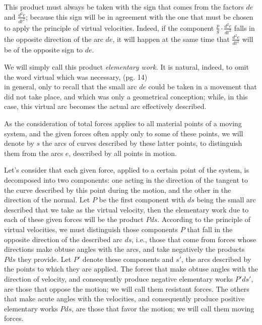\documentclass{book}
\begin{document}
This product must always be taken with the sign that comes from the factors \(de\) and \(\frac{d^2e}{dt^2}\); because this sign will be in agreement with the one that must be chosen to apply the principle of virtual velocities. Indeed, if the component \(\frac{p}{g} \cdot \frac{d^2e}{dt^2}\) falls in the opposite direction of the arc \(de\), it will happen at the same time that \(\frac{d^2e}{dt^2}\) will be of the opposite sign to \(de\).

We will simply call this product \textit{elementary work.} It is natural, indeed, to omit the word virtual which was necessary, 
\newpage
(pg. 14)\\
in general, only to recall that the small arc \(de\) could be taken in a movement that did not take place, and which was only a geometrical conception; while, in this case, this virtual arc becomes the actual arc effectively described.

As the consideration of total forces applies to all material points of a moving system, and the given forces often apply only to some of these points, we will denote by \( s \) the arcs of curves described by these latter points, to distinguish them from the arcs \( e \), described by all points in motion.

Let's consider that each given force, applied to a certain point of the system, is decomposed into two components: one acting in the direction of the tangent to the curve described by this point during the motion, and the other in the direction of the normal. Let \( P \) be the first component with \( ds \) being the small arc described that we take as the virtual velocity, then the elementary work due to each of these given forces will be the product \( Pds \). According to the principle of virtual velocities, we must distinguish those components \( P \) that fall in the opposite direction of the described arc \( ds \), i.e., those that come from forces whose directions make obtuse angles with the arcs, and take negatively the products \( Pds \) they provide. Let \( P' \) denote these components and \( s' \), the arcs described by the points to which they are applied. The forces that make obtuse angles with the direction of velocity, and consequently produce negative elementary works \( P'ds' \), are those that oppose the motion; we will call them resistant forces. The others that make acute angles with the velocities, and consequently produce positive elementary works \( Pds \), are those that favor the motion; we will call them moving forces.
\end{document}
